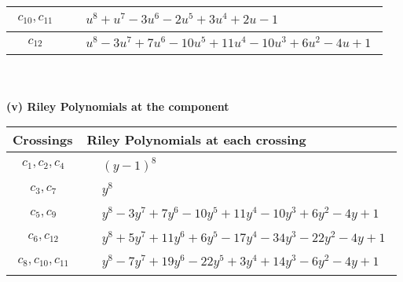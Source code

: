 \documentclass[1p]{elsarticle_modified}
\theoremstyle{definition}
\begin{document}
\begin{tabular}{m{50pt}|m{274pt}}
\hline $$\begin{aligned}c_{10},c_{11}\end{aligned}$$&$\begin{aligned}
&u^8+u^7-3 u^6-2 u^5+3 u^4+2 u-1
\end{aligned}$\\
\hline $$\begin{aligned}c_{12}\end{aligned}$$&$\begin{aligned}
&u^8-3 u^7+7 u^6-10 u^5+11 u^4-10 u^3+6 u^2-4 u+1
\end{aligned}$\\
\hline
\end{tabular}\\~\\
\newpage\renewcommand{\arraystretch}{1}
\flushleft \textbf{(v) Riley Polynomials at the component}\newline \\
\begin{tabular}{m{50pt}|m{274pt}}
Crossings & \hspace{64pt}Riley Polynomials at each crossing \\
\hline $$\begin{aligned}c_{1},c_{2},c_{4}\end{aligned}$$&$\begin{aligned}
&(y-1)^8
\end{aligned}$\\
\hline $$\begin{aligned}c_{3},c_{7}\end{aligned}$$&$\begin{aligned}
&y^8
\end{aligned}$\\
\hline $$\begin{aligned}c_{5},c_{9}\end{aligned}$$&$\begin{aligned}
&y^8-3 y^7+7 y^6-10 y^5+11 y^4-10 y^3+6 y^2-4 y+1
\end{aligned}$\\
\hline $$\begin{aligned}c_{6},c_{12}\end{aligned}$$&$\begin{aligned}
&y^8+5 y^7+11 y^6+6 y^5-17 y^4-34 y^3-22 y^2-4 y+1
\end{aligned}$\\
\hline $$\begin{aligned}c_{8},c_{10},c_{11}\end{aligned}$$&$\begin{aligned}
&y^8-7 y^7+19 y^6-22 y^5+3 y^4+14 y^3-6 y^2-4 y+1
\end{aligned}$\\
\hline
\end{tabular}\\~\\
\end{document}

